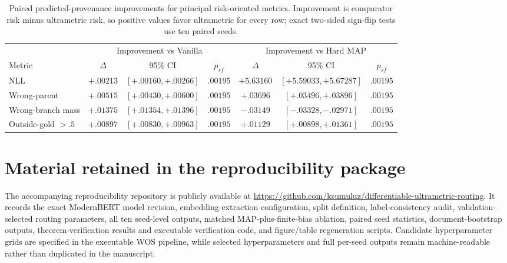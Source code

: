 \documentclass[11pt]{article}
\begin{document}
\begin{table}[H]
\centering
\caption{Paired predicted-provenance improvements for principal risk-oriented metrics. Improvement is comparator risk minus ultrametric risk, so positive values favor ultrametric for every row; exact two-sided sign-flip tests use ten paired seeds.}
\label{tab:risk}
\scriptsize
\setlength{\tabcolsep}{4pt}
\begin{tabular}{lccc|ccc}
\toprule
& \multicolumn{3}{c}{Improvement vs Vanilla} & \multicolumn{3}{c}{Improvement vs Hard MAP}\\
Metric & $\Delta$ & 95\% CI & $p_{sf}$ & $\Delta$ & 95\% CI & $p_{sf}$\\
\midrule
NLL & $+.00213$ & $[+.00160,+.00266]$ & $.00195$ & $+5.63160$ & $[+5.59033,+5.67287]$ & $.00195$\\
Wrong-parent & $+.00515$ & $[+.00430,+.00600]$ & $.00195$ & $+.03696$ & $[+.03496,+.03896]$ & $.00195$\\
Wrong-branch mass & $+.01375$ & $[+.01354,+.01396]$ & $.00195$ & $-.03149$ & $[-.03328,-.02971]$ & $.00195$\\
Outside-gold $>.5$ & $+.00897$ & $[+.00830,+.00963]$ & $.00195$ & $+.01129$ & $[+.00898,+.01361]$ & $.00195$\\
\bottomrule
\end{tabular}
\end{table}

\section{Material retained in the reproducibility package}
The accompanying reproducibility repository is publicly available at \url{https://github.com/ksumuluz/differentiable-ultrametric-routing}. It records the exact ModernBERT model revision, embedding-extraction configuration, split definition, label-consistency audit, validation-selected routing parameters, all ten seed-level outputs, matched MAP-plus-finite-bias ablation, paired seed statistics, document-bootstrap outputs, theorem-verification results and executable verification code, and figure/table regeneration scripts. Candidate hyperparameter grids are specified in the executable WOS pipeline, while selected hyperparameters and full per-seed outputs remain machine-readable rather than duplicated in the manuscript.
\end{document}

